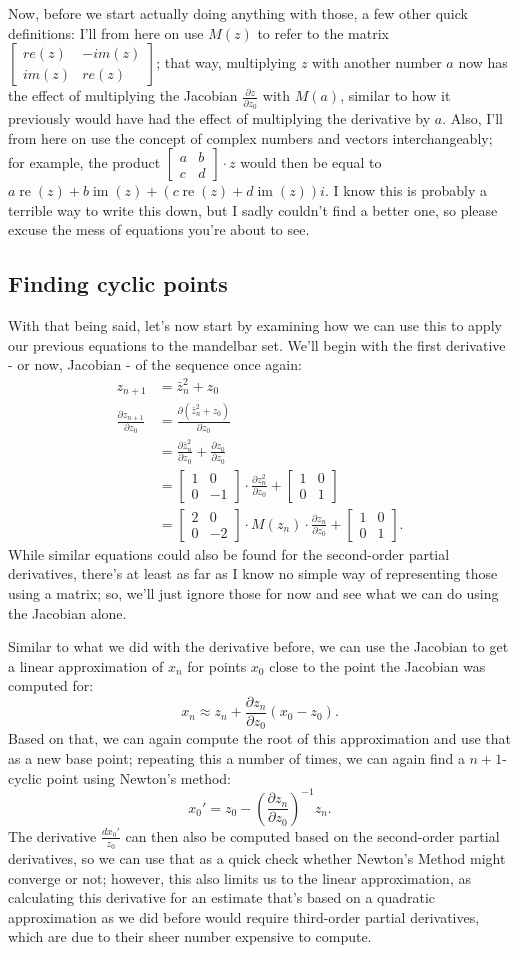 \documentclass[12pt,a4paper]{article}
\newcommand{\mat}[1]{\begin{bmatrix} #1 \end{bmatrix}}
\newcommand{\jmat}[2]{\frac{\partial #1}{\partial #2}}
\DeclareMathOperator{\re}{re}
\DeclareMathOperator{\im}{im}
\begin{document}
Now, before we start actually doing anything with those, a few other quick definitions: I'll from here on use $M(z)$ to refer to the matrix $\mat{re(z)&-im(z)\\im(z)&re(z)}$; that way, multiplying $z$ with another number $a$ now has the effect of multiplying the Jacobian $\jmat{z}{z_0}$ with $M(a)$, similar to how it previously would have had the effect of multiplying the derivative by $a$. Also, I'll from here on use the concept of complex numbers and vectors interchangeably; for example, the product $\mat{a&b\\c&d}\cdot z$ would then be equal to $a\re(z)+b\im(z)+(c\re(z)+d\im(z))i$. I know this is probably a terrible way to write this down, but I sadly couldn't find a better one, so please excuse the mess of equations you're about to see.

\subsection{Finding cyclic points}

With that being said, let's now start by examining how we can use this to apply our previous equations to the mandelbar set. We'll begin with the first derivative - or now, Jacobian - of the sequence once again:
\begin{align*}
	z_{n+1} &= \bar{z}_n^2+z_0\\
	\jmat{z_{n+1}}{z_0} &= \jmat{(\bar{z}_n^2+z_0)}{z_0}\\
	&= \jmat{\bar{z}_n^2}{z_0}+\jmat{z_0}{z_0}\\
	&= \mat{1&0\\0&-1}\cdot\jmat{z_n^2}{z_0}+\mat{1&0\\0&1}\\
	&= \mat{2&0\\0&-2}\cdot M(z_n)\cdot\jmat{z_n}{z_0}+\mat{1&0\\0&1}.
\end{align*}
While similar equations could also be found for the second-order partial derivatives, there's at least as far as I know no simple way of representing those using a matrix; so, we'll just ignore those for now and see what we can do using the Jacobian alone.

Similar to what we did with the derivative before, we can use the Jacobian to get a linear approximation of $x_n$ for points $x_0$ close to the point the Jacobian was computed for:
$$x_n \approx z_n+\jmat{z_n}{z_0}(x_0-z_0).$$
Based on that, we can again compute the root of this approximation and use that as a new base point; repeating this a number of times, we can again find a $n+1$-cyclic point using Newton's method:
$$x_0' = z_0-\left(\jmat{z_n}{z_0}\right)^{-1}z_n.$$
The derivative $\frac{dx_0'}{z_0}$ can then also be computed based on the second-order partial derivatives, so we can use that as a quick check whether Newton's Method might converge or not; however, this also limits us to the linear approximation, as calculating this derivative for an estimate that's based on a quadratic approximation as we did before would require third-order partial derivatives, which are due to their sheer number expensive to compute.
\end{document}
